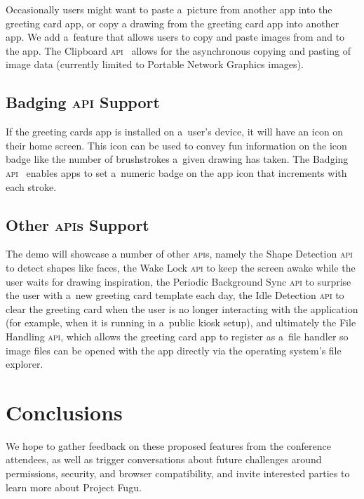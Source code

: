 \documentclass[sigconf]{acmart}
\begin{document}
Occasionally users might want to paste a~picture from another app into the greeting card app,
or copy a drawing from the greeting card app into another app.
We add a~feature that allows users to copy and paste images from and to the app.
The Clipboard \textsc{api}~\cite{kacmarcik19} allows for the asynchronous copying and pasting
of image data (currently limited to Portable Network Graphics images).

\subsection{Badging \textsc{api} Support}

If the greeting cards app is installed on a~user's device,
it will have an icon on their home screen.
This icon can be used to convey fun information on the icon badge
like the number of brushstrokes a~given drawing has taken.
The Badging \textsc{api}~\cite{giuca19} enables apps to set a~numeric badge on the app icon
that increments with each stroke.

\subsection{Other \textsc{api}s Support}

The demo will showcase a number of other \textsc{api}s, namely the
Shape Detection \textsc{api} to detect shapes like faces,
the Wake Lock  \textsc{api} to keep the screen awake
while the user waits for drawing inspiration, 
the Periodic Background Sync  \textsc{api} to surprise the user
with a~new greeting card template each day,
the Idle Detection \textsc{api} to clear the greeting card
when the user is no longer interacting with the application
(for example, when it is running in a~public kiosk setup),
and ultimately the File Handling \textsc{api}, which allows the greeting card app
to register as a~file handler so image files can be opened 
with the app directly via the operating system's file explorer.

\section{Conclusions}

We hope to gather feedback on these proposed features from the conference attendees,
as well as trigger conversations about future challenges around
permissions, security, and browser compatibility,
and invite interested parties to learn more about Project Fugu.
\end{document}
